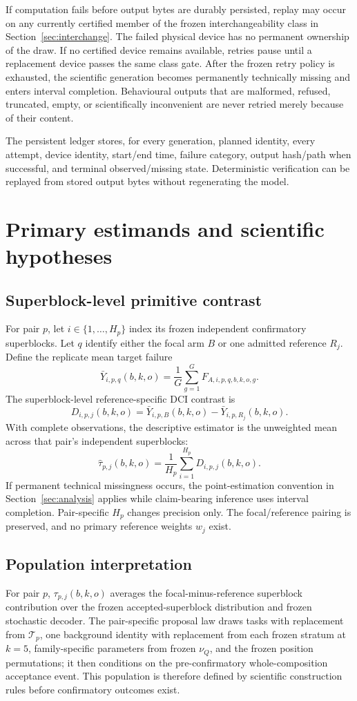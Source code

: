 \documentclass[11pt,a4paper]{article}
\begin{document}
If computation fails before output bytes are durably persisted, replay may occur on any currently certified member of the frozen interchangeability class in Section~\ref{sec:interchange}. The failed physical device has no permanent ownership of the draw. If no certified device remains available, retries pause until a replacement device passes the same class gate. After the frozen retry policy is exhausted, the scientific generation becomes permanently technically missing and enters interval completion. Behavioural outputs that are malformed, refused, truncated, empty, or scientifically inconvenient are never retried merely because of their content.

The persistent ledger stores, for every generation, planned identity, every attempt, device identity, start/end time, failure category, output hash/path when successful, and terminal observed/missing state. Deterministic verification can be replayed from stored output bytes without regenerating the model.

\section{Primary estimands and scientific hypotheses}
\label{sec:estimands}

\subsection{Superblock-level primitive contrast}

For pair $p$, let $i\in\{1,\ldots,H_p\}$ index its frozen independent confirmatory superblocks. Let $q$ identify either the focal arm $B$ or one admitted reference $R_j$. Define the replicate mean target failure
\[
\bar Y_{i,p,q}(b,k,o)
=
\frac{1}{G}\sum_{g=1}^{G}F_{A,i,p,q,b,k,o,g}.
\]
The superblock-level reference-specific DCI contrast is
\[
D_{i,p,j}(b,k,o)
=
\bar Y_{i,p,B}(b,k,o)
-
\bar Y_{i,p,R_j}(b,k,o).
\]
With complete observations, the descriptive estimator is the unweighted mean across that pair's independent superblocks:
\[
\widehat\tau_{p,j}(b,k,o)
=
\frac{1}{H_p}\sum_{i=1}^{H_p}D_{i,p,j}(b,k,o).
\]
If permanent technical missingness occurs, the point-estimation convention in Section~\ref{sec:analysis} applies while claim-bearing inference uses interval completion. Pair-specific $H_p$ changes precision only. The focal/reference pairing is preserved, and no primary reference weights $w_j$ exist.

\subsection{Population interpretation}
For pair $p$, $\tau_{p,j}(b,k,o)$ averages the focal-minus-reference superblock contribution over the frozen accepted-superblock distribution and frozen stochastic decoder. The pair-specific proposal law draws tasks with replacement from $\mathcal T_p$, one background identity with replacement from each frozen stratum at $k=5$, family-specific parameters from frozen $\nu_Q$, and the frozen position permutations; it then conditions on the pre-confirmatory whole-composition acceptance event. This population is therefore defined by scientific construction rules before confirmatory outcomes exist.
\end{document}
